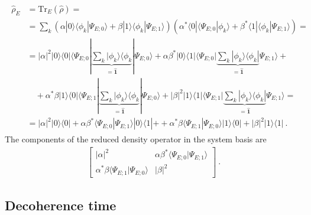 \documentclass[letterpaper,10pt,english]{jupyterBook}
\begin{document}
\begin{equation*}
\begin{split}\begin{aligned}
  \hat{\rho}_E 
  & = \text{Tr}_E \left( \hat{\rho} \right) = \\
  & = \sum_{k} \left( \alpha | 0 \rangle \langle \phi_k | \Psi_{E;0} \rangle + \beta | 1 \rangle \langle \phi_k | \Psi_{E;1} \rangle \right)  \left( \alpha^* \langle 0 | \langle \Psi_{E;0} | \phi_k  \rangle + \beta^* \langle 1 | \langle \phi_k | \Psi_{E;1} \rangle  \right) = \\
  & = |\alpha|^2 | 0 \rangle \langle 0 | \langle \Psi_{E;0} | \underbrace{\sum_k | \phi_k \rangle \langle \phi_k}_{= \hat{\mathbf{1}}} | \Psi_{E;0} \rangle + 
      \alpha \beta^* | 0 \rangle \langle 1 | \langle \Psi_{E;0} | \underbrace{\sum_k | \phi_k \rangle \langle \phi_k |}_{= \hat{\mathbf{1}} } \Psi_{E;1} \rangle + \\
  & \quad + 
      \alpha^* \beta | 1 \rangle \langle 0 | \langle \Psi_{E;1} | \underbrace{\sum_k | \phi_k \rangle \langle \phi_k}_{= \hat{\mathbf{1}}} | \Psi_{E;0} \rangle + 
      |\beta|^2 | 1 \rangle \langle 1 | \langle \Psi_{E;1} | \underbrace{\sum_k | \phi_k \rangle \langle \phi_k |}_{= \hat{\mathbf{1}} } \Psi_{E;1} \rangle = \\
  & = |\alpha|^2 | 0 \rangle \langle 0 | + \alpha \beta^* \langle \Psi_{E;0} | \Psi_{E;1} \rangle | 0 \rangle \langle 1 | + 
    + \alpha^* \beta \langle \Psi_{E;1} | \Psi_{E;0} \rangle | 1 \rangle \langle 0 | + |\beta|^2 | 1 \rangle \langle 1 | \ . 
\end{aligned}\end{split}
\end{equation*}
\sphinxAtStartPar
The components of the reduced density operator in the system basis are
\begin{equation*}
\begin{split}\begin{bmatrix} |\alpha|^2  & \alpha \beta^* \langle \Psi_{E;0} | \Psi_{E;1} \rangle \\ \alpha^* \beta \langle \Psi_{E;1} | \Psi_{E;0} \rangle & |\beta|^2 \end{bmatrix} \ .\end{split}
\end{equation*}

\subsection{Decoherence time}
\label{\detokenize{ch/quantum-mechanics/decoherence:decoherence-time}}
\sphinxAtStartPar
{} 
\end{document}
